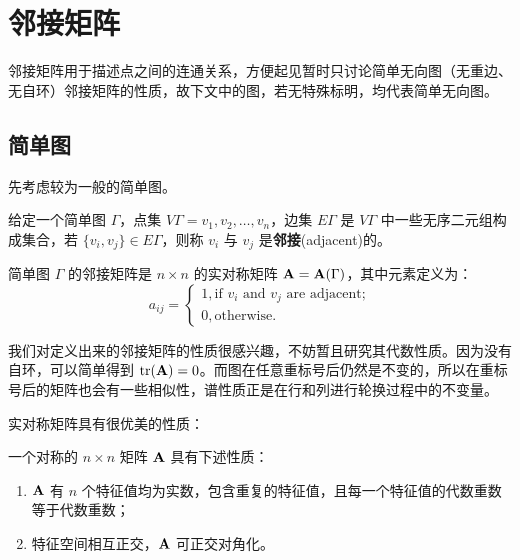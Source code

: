 \chapter{邻接矩阵}

邻接矩阵用于描述点之间的连通关系，方便起见暂时只讨论简单无向图（无重边、无自环）邻接矩阵的性质，故下文中的图，若无特殊标明，均代表简单无向图。


\section{简单图}

先考虑较为一般的简单图。

\begin{definition}[简单图的邻接矩阵]
给定一个简单图 $\Gamma$，点集 $V\Gamma = {v_1, v_2, \dots, v_n}$，边集 $E\Gamma$ 是 $V\Gamma$ 中一些无序二元组构成集合，若 $\{v_i, v_j\} \in E\Gamma$，则称 $v_i$ 与 $v_j$ 是\textbf{邻接}(adjacent)的。

简单图 $\Gamma$ 的邻接矩阵是 $n\times n$ 的实对称矩阵 $\textbf A = \textbf A(\Gamma)$，其中元素定义为：
\[
a_{ij} = \begin{cases}
  1, \text{if $v_i$ and $v_j$ are adjacent;} \\ 
  0, \text{otherwise.}
\end{cases}
\]
\end{definition}

我们对定义出来的邻接矩阵的性质很感兴趣，不妨暂且研究其代数性质。因为没有自环，可以简单得到 $\text{tr}(\textbf A) = 0$。而图在任意重标号后仍然是不变的，所以在重标号后的矩阵也会有一些相似性，谱性质正是在行和列进行轮换过程中的不变量。

实对称矩阵具有很优美的性质：

\begin{theorem}[对称矩阵的谱定理]
一个对称的 $n\times n$ 矩阵 $\textbf A$ 具有下述性质：
\begin{enumerate} 
\item $\textbf A$ 有 $n$ 个特征值均为实数，包含重复的特征值，且每一个特征值的代数重数等于代数重数；

\item 特征空间相互正交，$\textbf A$ 可正交对角化。
\end{enumerate} 
\end{theorem}


